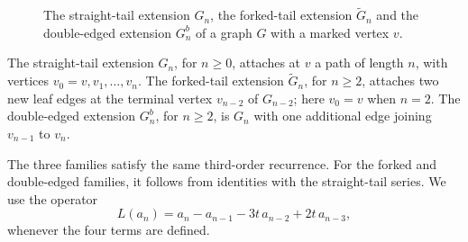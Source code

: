 \documentclass[reqno]{article}
\theoremstyle{plain} %
\theoremstyle{definition}
\theoremstyle{remark}
\newcommand{\R}{\mathbb{R}}
\numberwithin{equation}{section}
\begin{document}
\begin{figure}[htbp]
\begin{minipage}[c]{7.1cm}
\end{minipage}
\caption{The straight-tail extension $G_n$, the forked-tail extension
$\widetilde G_n$ and the double-edged extension $G^b_n$ of a graph $G$
with a marked vertex $v$.}
\label{fig:tails}
\end{figure}

The straight-tail extension $G_n$, for $n\ge0$, attaches at $v$ a path
of length $n$, with vertices $v_0=v,v_1,\ldots,v_n$. The forked-tail
extension $\widetilde G_n$, for $n\ge2$, attaches two new leaf edges at
the terminal vertex $v_{n-2}$ of $G_{n-2}$; here $v_0=v$ when $n=2$.
The double-edged extension $G_n^b$, for $n\ge2$, is $G_n$ with one
additional edge joining $v_{n-1}$ to $v_n$.

The three families satisfy the same third-order recurrence. For the
forked and double-edged families, it follows from identities with the
straight-tail series. We use the operator
\begin{equation}\label{eq:L}
 L(a_n)=a_n-a_{n-1}-3t\,a_{n-2}+2t\,a_{n-3},
\end{equation}
whenever the four terms are defined.
\end{document}
